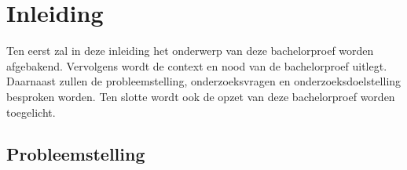 
\chapter{Inleiding}
\label{ch:inleiding}



Ten eerst zal in deze inleiding het onderwerp van deze bachelorproef worden afgebakend. Vervolgens wordt de context en nood van de bachelorproef uitlegt. Daarnaast zullen de probleemstelling, onderzoeksvragen en onderzoeksdoelstelling besproken worden. Ten slotte wordt ook de opzet van deze bachelorproef worden toegelicht. 

\section{Probleemstelling}
\label{sec:probleemstelling}


